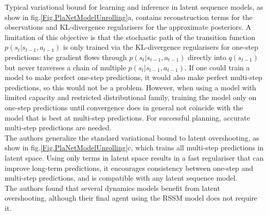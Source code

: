 Typical variational bound for learning and inference in latent sequence models, as show in fig.\ref{Fig.PlaNetModelUnrolling}a, contains reconstruction terms for the observations and KL-divergence regularisers for the approximate posteriors. A limitation of this objective is that the stochastic path of the transition function $p(s_t | s_{t-1}, a_{t-1})$ is only trained via the KL-divergence regularisers for one-step predictions: the gradient flows through $p(s_t | s_{t-1}, a_{t-1})$ directly into $q(s_{t−1})$ but never traverses a chain of multiple $p(s_t | s_{t-1}, a_{t-1})$. If one could train a model to make perfect one-step predictions, it would also make perfect multi-step predictions, so this would not be a problem. However, when using a model with limited capacity and restricted distributional family, training the model only on one-step predictions until convergence does in general not coincide with the model that is best at multi-step predictions. For successful planning, accurate multi-step predictions are needed. \\
The authors generalize the standard variational bound to latent overshooting, as show in fig.\ref{Fig.PlaNetModelUnrolling}c, which trains all multi-step predictions in latent space. Using only terms in latent space results in a fast regulariser that can improve long-term predictions, it encourages consistency between one-step and multi-step predictions, and is compatible with any latent sequence model. \\
The authors found that several dynamics models benefit from latent overshooting, although their final agent using the RSSM model does not require it.

